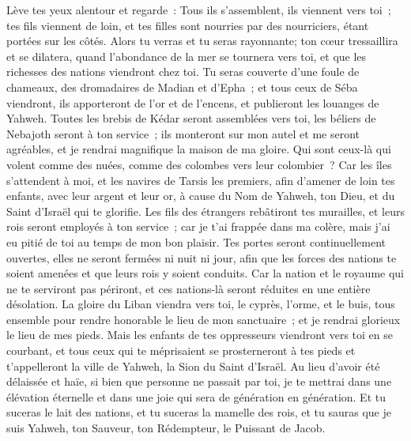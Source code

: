 \begin{multicols}{2}
Lève tes yeux alentour et regarde~: Tous ils s'assemblent, ils viennent vers toi~; tes fils viennent de loin, et tes filles sont nourries par des nourriciers, étant portées sur les côtés.
Alors tu verras et tu seras rayonnante; ton cœur tressaillira et se dilatera, quand l'abondance de la mer se tournera vers toi, et que les richesses des nations viendront chez toi.
Tu seras couverte d'une foule de chameaux, des dromadaires de Madian et d'Epha~; et tous ceux de Séba viendront, ils apporteront de l'or et de l'encens, et publieront les louanges de Yahweh.
Toutes les brebis de Kédar seront assemblées vers toi, les béliers de Nebajoth seront à ton service~; ils monteront sur mon autel et me seront agréables, et je rendrai magnifique la maison de ma gloire.
Qui sont ceux-là qui volent comme des nuées, comme des colombes vers leur colombier~?
Car les îles s'attendent à moi, et les navires de Tarsis les premiers, afin d'amener de loin tes enfants, avec leur argent et leur or, à cause du Nom de Yahweh, ton Dieu, et du Saint d'Israël qui te glorifie.
Les fils des étrangers rebâtiront tes murailles, et leurs rois seront employés à ton service~; car je t'ai frappée dans ma colère, mais j'ai eu pitié de toi au temps de mon bon plaisir.
Tes portes seront continuellement ouvertes, elles ne seront fermées ni nuit ni jour, afin que les forces des nations te soient amenées et que leurs rois y soient conduits.
Car la nation et le royaume qui ne te serviront pas périront, et ces nations-là seront réduites en une entière désolation.
La gloire du Liban viendra vers toi, le cyprès, l'orme, et le buis, tous ensemble pour rendre honorable le lieu de mon sanctuaire~; et je rendrai glorieux le lieu de mes pieds.
Mais les enfants de tes oppresseurs viendront vers toi en se courbant, et tous ceux qui te méprisaient se prosterneront à tes pieds et t'appelleront la ville de Yahweh, la Sion du Saint d'Israël.
Au lieu d'avoir été délaissée et haïe, si bien que personne ne passait par toi, je te mettrai dans une élévation éternelle et dans une joie qui sera de génération en génération.
Et tu suceras le lait des nations, et tu suceras la mamelle des rois, et tu sauras que je suis Yahweh, ton Sauveur, ton Rédempteur, le Puissant de Jacob.

\end{multicols}
